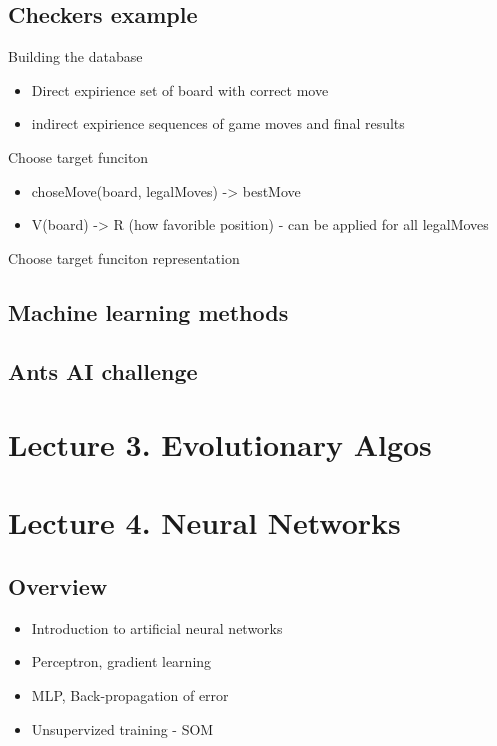 \documentclass[12pt, letterpaper, twoside]{article}
\begin{document}
\subsection*{Checkers example}

Building the database
\begin{itemize}
    \item Direct expirience
    \subitem set of board with correct move
    \item indirect expirience
    \subitem sequences of game moves and final results
\end{itemize}

Choose target funciton
\begin{itemize}
    \item choseMove(board, legalMoves) -> bestMove
    \item V(board) -> R (how favorible position) - can be applied for all legalMoves
\end{itemize}

Choose target funciton representation

\subsection*{Machine learning methods}

\subsection*{Ants AI challenge}

\section{Lecture 3. Evolutionary Algos}

\subsection*{}


\section{Lecture 4. Neural Networks}

\subsection*{Overview}
\begin{itemize}
    \item Introduction to artificial neural networks
    \item Perceptron, gradient learning
    \item MLP, Back-propagation of error
    \item Unsupervized training - SOM
\end{itemize}
\end{document}
